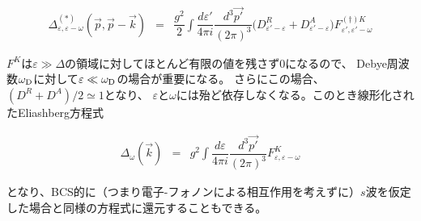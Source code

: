 \documentclass[uplatex,a4j,12pt,dvipdfmx]{jsarticle}
\begin{document}
\begin{eqnarray}
	\Delta_{\varepsilon , \varepsilon - \omega}^{(*)} (\vec{p} , \vec{p} - \vec{k})
	&=&
	\dfrac{g^{2}}{2}
	\int \!\! \dfrac{d \varepsilon'}{4 \pi i} \dfrac{d^{3} \vec{p'}}{ (2 \pi)^{3}}
	\big( D^{R}_{\varepsilon' - \varepsilon} + D^{A}_{\varepsilon' - \varepsilon} \big)
	F^{(\dagger)K}_{\varepsilon' , \varepsilon' - \omega}
\end{eqnarray}

$F^{K}$は$\varepsilon \gg \Delta$の領域に対してほとんど有限の値を残さず0になるので、
Debye周波数$\omega_{\rm D}$に対して$\varepsilon \ll \omega_{\rm D}$の場合が重要になる。
さらにこの場合、$(D^{R} + D^{A})/2 \simeq 1$となり、
$\varepsilon$と$\omega$には殆ど依存しなくなる。このとき線形化されたEliashberg方程式

\begin{eqnarray}
	\Delta_{\omega}^{} (\vec{k})
	&=&
	g^{2}
	\int \!\! \dfrac{d \varepsilon}{4 \pi i} \dfrac{d^{3} \vec{p'}}{ (2 \pi)^{3}}
	F^{K}_{\varepsilon , \varepsilon - \omega}
\end{eqnarray}

となり、BCS的に（つまり電子-フォノンによる相互作用を考えずに）$s$波を仮定した場合と同様の方程式に還元することもできる。
\end{document}
